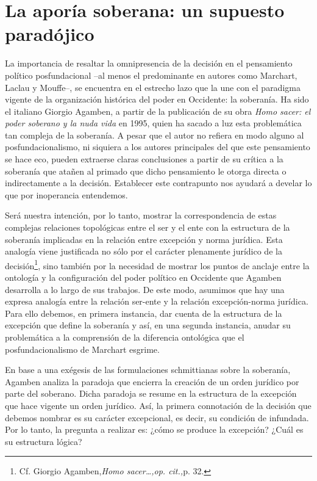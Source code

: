\section{La aporía soberana: un supuesto paradójico}

La importancia de resaltar la omnipresencia de la decisión en el pensamiento político posfundacional --al menos el predominante en autores como Marchart, Laclau y Mouffe--, se encuentra en el estrecho lazo que la une con el paradigma vigente de la organización histórica del poder en Occidente: la soberanía. Ha sido el italiano Giorgio Agamben, a partir de la publicación de su obra \emph{Homo sacer: el poder soberano y la nuda vida} en 1995, quien ha sacado a luz esta problemática tan compleja de la soberanía. A pesar que el autor no refiera en modo alguno al posfundacionalismo, ni siquiera a los autores principales del que este pensamiento se hace eco, pueden extraerse claras conclusiones a partir de su crítica a la soberanía que atañen al primado que dicho pensamiento le otorga directa o indirectamente a la decisión. Establecer este contrapunto nos ayudará a develar lo que por inoperancia entendemos.

Será nuestra intención, por lo tanto, mostrar la correspondencia de estas complejas relaciones topológicas entre el ser y el ente con la estructura de la soberanía implicadas en la relación entre excepción y norma jurídica. Esta analogía viene justificada no sólo por el carácter plenamente jurídico de la decisión\footnote{Cf. Giorgio Agamben,\emph{Homo sacer\ldots,op. cit.,}p. 32.}, sino también por la necesidad de mostrar los puntos de anclaje entre la ontología y la configuración del poder político en Occidente que Agamben desarrolla a lo largo de sus trabajos. De este modo, asumimos que hay una expresa analogía entre la relación ser-ente y la relación excepción-norma jurídica. Para ello debemos, en primera instancia, dar cuenta de la estructura de la excepción que define la soberanía y así, en una segunda instancia, anudar su problemática a la comprensión de la diferencia ontológica que el posfundacionalismo de Marchart esgrime.

En base a una exégesis de las formulaciones schmittianas sobre la soberanía, Agamben analiza la paradoja que encierra la creación de un orden jurídico por parte del soberano. Dicha paradoja se resume en la estructura de la excepción que hace vigente un orden jurídico. Así, la primera connotación de la decisión que debemos nombrar es su carácter excepcional, es decir, su condición de infundada. Por lo tanto, la pregunta a realizar es: ¿cómo se produce la excepción? ¿Cuál es su estructura lógica?

